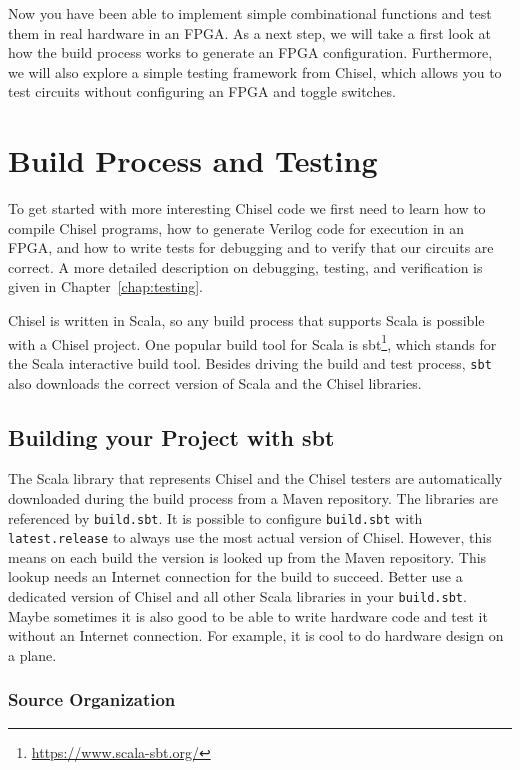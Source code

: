 \documentclass[%
    10pt,
    headinclude, footexclude,
    openright, %
    notitlepage,
    cleardoubleempty,
    headsepline,
    pointlessnumbers,
    bibtotoc, idxtotoc,
    ]{scrbook}
\newcommand{\code}[1]{{\small{\texttt{#1}}}}
\newcommand{\myref}[2]{\href{#1}{#2}}
\renewcommand{\myref}[2]{{#2}{\footnote{\url{#1}}}}
\begin{document}
Now you have been able to implement simple combinational functions and test them
in real hardware in an FPGA. As a next step, we will take a first look at how the build
process works to generate an FPGA configuration. Furthermore, we will also
explore a simple testing framework from Chisel, which allows you to test circuits
without configuring an FPGA and toggle switches.

\chapter{Build Process and Testing}

To get started with more interesting Chisel code we first need to learn how to compile
Chisel programs, how to generate Verilog code for execution in an FPGA,
and how to write tests for debugging and to verify that our circuits are correct.
A more detailed description on debugging, testing, and verification is given
in Chapter~\ref{chap:testing}.

Chisel is written in Scala, so any build process that supports Scala is possible
with a Chisel project. One popular build tool for Scala is \myref{https://www.scala-sbt.org/}{sbt},
which stands for the Scala interactive build tool.
Besides driving the build and test process, \code{sbt} also downloads the correct
version of Scala and the Chisel libraries.

\section{Building your Project with sbt}


The Scala library that represents Chisel and the Chisel testers are automatically
downloaded during the build process from a Maven repository.
The libraries are referenced by \code{build.sbt}. It is possible to configure \code{build.sbt}
with \code{latest.release} to always use the most actual version of Chisel.
However, this means on each build the version is looked up from the Maven
repository. This lookup needs an Internet connection for the build to succeed.
Better use a dedicated version of Chisel and all other Scala libraries in your \code{build.sbt}.
Maybe sometimes it is also good to be able to write hardware code and test it without an Internet connection.
For example, it is cool to do hardware design on a plane.

\subsection{Source Organization}
\end{document}
